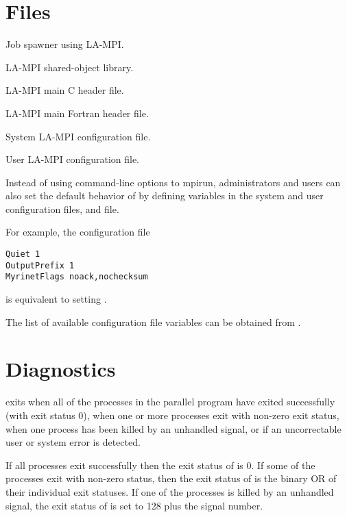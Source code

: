 \documentclass[english]{article}
\begin{document}
\section{Files}
\begin{Description}\setlength{\itemsep}{0cm}
\item[\File{mpirun}] Job spawner using LA-MPI.
\item[\File{libmpi.so}] LA-MPI shared-object library.
\item[\File{mpi.h}] LA-MPI main C header file.
\item[\File{mpif.h}] LA-MPI main Fortran header file.
\item[\File{\$MPI\_ROOT/etc/lampi.conf}] System LA-MPI configuration file.
\item[\File{\$HOME/.lampi.conf}] User LA-MPI configuration file.

Instead of using command-line options to mpirun, administrators and
users can also set the default behavior of  by defining
variables in the system and user configuration files,
 and 
file.

For example, the configuration file

\begin{verbatim}
Quiet 1
OutputPrefix 1
MyrinetFlags noack,nochecksum
\end{verbatim}

is equivalent to setting .

The list of available configuration file variables can be
obtained from .

\end{Description}

\section{Diagnostics}

 exits when all of the processes in the parallel program
have exited successfully (with exit status 0), when one or more
processes exit with non-zero exit status, when one process has been
killed by an unhandled signal, or if an uncorrectable user or system
error is detected.

If all processes exit successfully then the exit status of
 is 0.  If some of the processes exit with non-zero
status, then the exit status of  is the binary OR of
their individual exit statuses. If one of the processes is killed by
an unhandled signal, the exit status of  is set to 128
plus the signal number.
\end{document}
